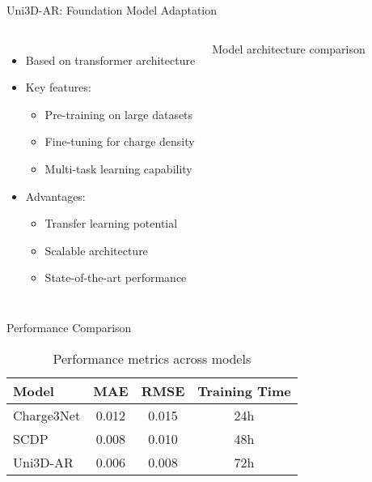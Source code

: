 \documentclass[aspectratio=169]{beamer}
\begin{document}
\begin{frame}{Uni3D-AR: Foundation Model Adaptation}
    \begin{columns}
        \begin{itemize}
            \item Based on transformer architecture
            \item Key features:
            \begin{itemize}
                \item Pre-training on large datasets
                \item Fine-tuning for charge density
                \item Multi-task learning capability
            \end{itemize}
            \item Advantages:
            \begin{itemize}
                \item Transfer learning potential
                \item Scalable architecture
                \item State-of-the-art performance
            \end{itemize}
        \end{itemize}
        Model architecture comparison
    \end{columns}
\end{frame}

\begin{frame}{Performance Comparison}
    \begin{table}[h]
        \centering
        \begin{tabular}{lccc}
            \toprule
            Model & MAE & RMSE & Training Time \\
            \midrule
            Charge3Net & 0.012 & 0.015 & 24h \\
            SCDP & 0.008 & 0.010 & 48h \\
            Uni3D-AR & 0.006 & 0.008 & 72h \\
            \bottomrule
        \end{tabular}
        \caption{Performance metrics across models}
    \end{table}
\end{frame}
\end{document}
